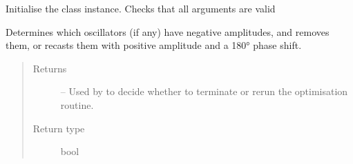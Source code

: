 \documentclass[letterpaper,10pt,english]{sphinxmanual}
\begin{document}
\begin{fulllineitems}
\begin{fulllineitems}
\label{\detokenize{references/nlp/nlp:nmrespy.nlp.nlp.NonlinearProgramming.__init__}}
\sphinxAtStartPar
Initialise the class instance. Checks that all arguments are
valid

\end{fulllineitems}


\begin{fulllineitems}
\label{\detokenize{references/nlp/nlp:nmrespy.nlp.nlp.NonlinearProgramming._check_negative_amps}}
\sphinxAtStartPar
Determines which oscillators (if any) have negative amplitudes, and
removes them, or recasts them with positive amplitude and a 180° phase
shift.
\begin{quote}\begin{description}
\item[{Returns}] \leavevmode
\sphinxAtStartPar
{} – Used by  to decide whether to terminate
or re\sphinxhyphen{}run the optimisation routine.

\item[{Return type}] \leavevmode
\sphinxAtStartPar
bool

\end{description}\end{quote}


\end{fulllineitems}
\end{fulllineitems}
\end{document}
